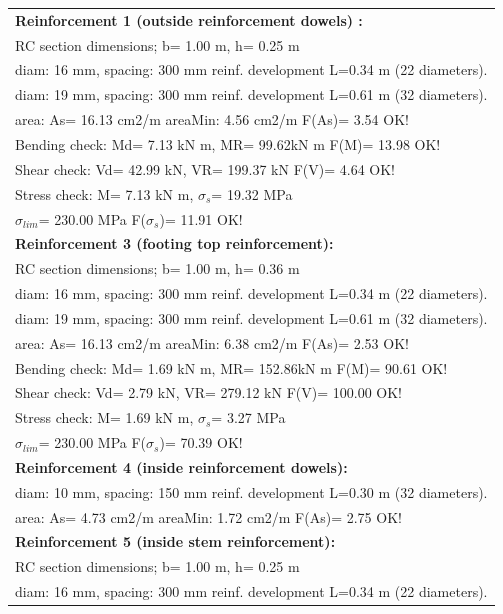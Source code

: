 \begin{center}
\begin{supertabular}[H]{|l|}
\hline
\textbf{Reinforcement 1 (outside reinforcement dowels) :} \\
  RC section dimensions; b= 1.00 m, h= 0.25 m\\
  diam: 16 mm, spacing: 300 mm  reinf. development L=0.34 m (22 diameters).\\
  diam: 19 mm, spacing: 300 mm  reinf. development L=0.61 m (32 diameters).\\
  area: As=  16.13 cm2/m areaMin:   4.56 cm2/m  F(As)= 3.54 OK!\\
  Bending check: Md=   7.13 kN m, MR=  99.62kN m  F(M)= 13.98 OK!\\
  Shear check: Vd=  42.99 kN,  VR= 199.37 kN  F(V)= 4.64 OK!\\
  Stress check: M=   7.13 kN m, $\sigma_s$=  19.32 MPa\\
    $\sigma_{lim}$= 230.00 MPa  F($\sigma_s$)= 11.91 OK!\\
\textbf{Reinforcement 3 (footing top reinforcement):}\\
  RC section dimensions; b= 1.00 m, h= 0.36 m\\
  diam: 16 mm, spacing: 300 mm  reinf. development L=0.34 m (22 diameters).\\
  diam: 19 mm, spacing: 300 mm  reinf. development L=0.61 m (32 diameters).\\
  area: As=  16.13 cm2/m areaMin:   6.38 cm2/m  F(As)= 2.53 OK!\\
  Bending check: Md=   1.69 kN m, MR= 152.86kN m  F(M)= 90.61 OK!\\
  Shear check: Vd=   2.79 kN,  VR= 279.12 kN  F(V)= 100.00 OK!\\
  Stress check: M=   1.69 kN m, $\sigma_s$=   3.27 MPa\\
    $\sigma_{lim}$= 230.00 MPa  F($\sigma_s$)= 70.39 OK!\\
\textbf{Reinforcement 4 (inside reinforcement dowels):}\\
  diam: 10 mm, spacing: 150 mm  reinf. development L=0.30 m (32 diameters).\\
  area: As=   4.73 cm2/m areaMin:   1.72 cm2/m  F(As)= 2.75 OK!\\
\textbf{Reinforcement 5 (inside stem reinforcement):}\\
  RC section dimensions; b= 1.00 m, h= 0.25 m\\
  diam: 16 mm, spacing: 300 mm  reinf. development L=0.34 m (22 diameters).\\

\end{supertabular}
\end{center}
